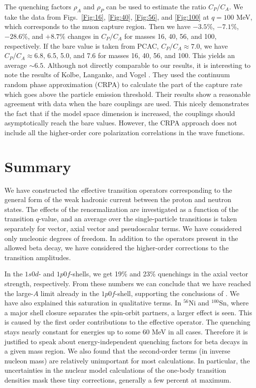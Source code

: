 The quenching factors $\rho_A$ and $\rho_P$ can be used to estimate
the ratio $C_P/C_A$. We take the data from Figs.\ \ref{Fig:16},
\ref{Fig:40}, \ref{Fig:56}, and \ref{Fig:100} at $q=100$ MeV, which 
corresponds to
the muon capture region. Then we have $-3.5$\%, $-7.1$\%, $-28.6$\%,
and $+8.7$\%
changes in $C_P/C_A$ for masses 16, 40, 56, and 100, respectively. If the
bare value is taken from PCAC, $C_P/C_A\approx 7.0$, we have
$C_P/C_A\approx 6.8$, 6.5, 5.0, and 7.6 for masses 16, 40, 56, and
100. This yields an average $\sim 6.5$. 
Although not directly comparable to our results, it is
interesting to note the results of Kolbe, Langanke, and Vogel 
\cite{kol94}. They used the
continuum random phase approximation (CRPA) to calculate the part of the
capture rate which goes above the particle emission threshold. Their
results show a reasonable agreement with data when the bare couplings
are used. This nicely demonstrates the fact that if the model space
dimension is increased, the couplings should asymptotically reach the
bare values. However, the CRPA approach does not include all the higher-order
core polarization correlations in the wave functions.

\section{Summary}

We have constructed the effective transition operators corresponding to
the general form of the weak hadronic current between the proton and
neutron states. The effects of the renormalization are investigated as a
function of the transition $q$-value, and an average over the 
single-particle transitions is taken
separately for vector, axial vector and pseudoscalar terms. We have considered
only nucleonic degrees of freedom. In addition to the operators present
in the allowed beta decay, we have considered the higher-order corrections
to the transition amplitudes.

In the $1s0d$- and $1p0f$-shells, we get 19\% and 23\% quenchings in the axial 
vector strength, respectively.  From these numbers we can conclude that
we have reached the large-$A$ limit already in the $1p0f$-shell, supporting the 
conclusions of \cite{mar96}. We have also explained this saturation in
qualitative terms. In $^{56}$Ni and $^{100}$Sn, where a major shell closure
separates the spin-orbit partners, a larger effect is seen. This is caused
by the first order contributions to the effective operator. The quenching
stays nearly constant for energies up to some 60 MeV in all cases. Therefore
it is justified to speak about energy-independent quenching factors for beta
decays in a given mass region. We also found that the
second-order terms (in inverse nucleon mass) are relatively unimportant for
most calculations. In particular, the uncertainties in the nuclear
model calculations of the one-body transition densities mask these tiny
corrections, generally a few percent at maximum.

